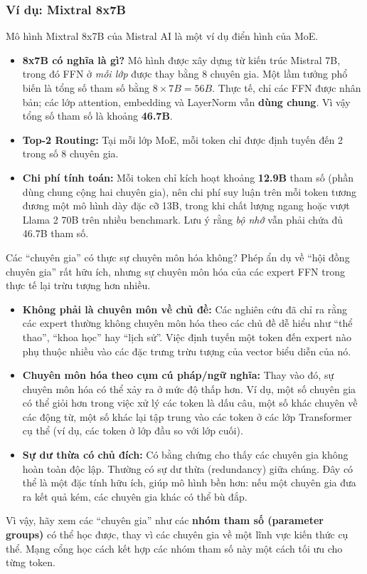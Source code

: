 \subsubsection{Ví dụ: Mixtral 8x7B}
Mô hình Mixtral 8x7B của Mistral AI \cite{jiang2024mixtral} là một ví dụ điển hình của MoE.
\begin{itemize}
    \item \textbf{8x7B có nghĩa là gì?} Mô hình được xây dựng từ kiến trúc Mistral 7B, trong đó FFN ở \emph{mỗi lớp} được thay bằng 8 chuyên gia. Một lầm tưởng phổ biến là tổng số tham số bằng $8 \times 7B = 56B$. Thực tế, chỉ các FFN được nhân bản; các lớp attention, embedding và LayerNorm vẫn \textbf{dùng chung}. Vì vậy tổng số tham số là khoảng \textbf{46.7B}.
    \item \textbf{Top-2 Routing:} Tại mỗi lớp MoE, mỗi token chỉ được định tuyến đến 2 trong số 8 chuyên gia.
    \item \textbf{Chi phí tính toán:} Mỗi token chỉ kích hoạt khoảng \textbf{12.9B} tham số (phần dùng chung cộng hai chuyên gia), nên chi phí suy luận trên mỗi token tương đương một mô hình dày đặc cỡ 13B, trong khi chất lượng ngang hoặc vượt Llama 2 70B trên nhiều benchmark. Lưu ý rằng \emph{bộ nhớ} vẫn phải chứa đủ 46.7B tham số.
\end{itemize}
\begin{deepdive}{Các “chuyên gia” có thực sự chuyên môn hóa không?}
Phép ẩn dụ về “hội đồng chuyên gia” rất hữu ích, nhưng sự chuyên môn hóa của các expert FFN trong thực tế lại trừu tượng hơn nhiều.
\begin{itemize}
    \item \textbf{Không phải là chuyên môn về chủ đề:} Các nghiên cứu đã chỉ ra rằng các expert thường không chuyên môn hóa theo các chủ đề dễ hiểu như “thể thao”, “khoa học” hay “lịch sử”. Việc định tuyến một token đến expert nào phụ thuộc nhiều vào các đặc trưng trừu tượng của vector biểu diễn của nó.
    \item \textbf{Chuyên môn hóa theo cụm cú pháp/ngữ nghĩa:} Thay vào đó, sự chuyên môn hóa có thể xảy ra ở mức độ thấp hơn. Ví dụ, một số chuyên gia có thể giỏi hơn trong việc xử lý các token là dấu câu, một số khác chuyên về các động từ, một số khác lại tập trung vào các token ở các lớp Transformer cụ thể (ví dụ, các token ở lớp đầu so với lớp cuối).
    \item \textbf{Sự dư thừa có chủ đích:} Có bằng chứng cho thấy các chuyên gia không hoàn toàn độc lập. Thường có sự dư thừa (redundancy) giữa chúng. Đây có thể là một đặc tính hữu ích, giúp mô hình bền hơn: nếu một chuyên gia đưa ra kết quả kém, các chuyên gia khác có thể bù đắp.
\end{itemize}
Vì vậy, hãy xem các “chuyên gia” như các \textbf{nhóm tham số (parameter groups)} có thể học được, thay vì các chuyên gia về một lĩnh vực kiến thức cụ thể. Mạng cổng học cách kết hợp các nhóm tham số này một cách tối ưu cho từng token.
\end{deepdive}
